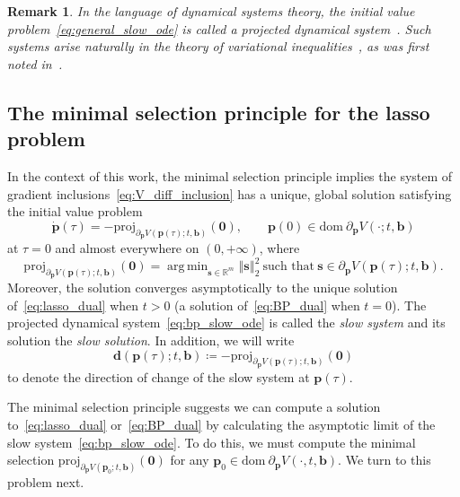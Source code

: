 \documentclass[11pt]{article}
\numberwithin{prop}{section}
\numberwithin{lem}{section}
\newtheorem{rem}{Remark}[section]
\numberwithin{rem}{section}
\numberwithin{cor}{section}
\numberwithin{thm}{section}
\numberwithin{defn}{section}
\numberwithin{fact}{section}
\theoremstyle{plain}
\def\bb {\boldsymbol{b}}
\def\bd {\boldsymbol{d}}
\def\bp {\boldsymbol{p}}
\def\bs {\boldsymbol{s}}
\def\R {\mathbb{R}}
\newcommand{\normsq}[1]{\left\Vert{#1} \right\Vert_{2}^{2}}
\def\dom {\mathrm{dom~}}    %
\def\proj {\mathrm{proj}}
\def\Rm {\R^m}
\DeclareMathOperator*{\argmin}{arg\,min}
\def\bpo {\bp_{0}}
\begin{document}
\begin{rem}
In the language of dynamical systems theory, the initial value problem~\eqref{eq:general_slow_ode} is called a \emph{projected dynamical system}~\cite{dupuis1993dynamical}. Such systems arise naturally in the theory of variational inequalities~\cite[Chapter 17]{attouch2014variational}, as was first noted in~\cite{dupuis1991lipschitz}.
\end{rem}




\subsection{The minimal selection principle for the lasso problem}\label{subsec:selection_principle}

In the context of this work, the minimal selection principle implies the system of gradient inclusions~\eqref{eq:V_diff_inclusion} has a unique, global solution satisfying the initial value problem
\begin{equation}\label{eq:bp_slow_ode}
    \dot{\bp}(\tau) =-\proj_{\partial_{\bp} V(\bp(\tau);t,\bb)}(\boldsymbol{0}), \qquad \bp(0) \in \dom \partial_{\bp} V(\cdot;t,\bb)
\end{equation}
at $\tau = 0$ and almost everywhere on $(0,+\infty)$, where
\[
\proj_{\partial_{\bp} V(\bp(\tau);t,\bb)}(\boldsymbol{0}) = \argmin_{\bs \in \Rm} \normsq{\bs} \ \text{such that} \ \bs \in \partial_{\bp}V(\bp(\tau);t,\bb).
\]
Moreover, the solution converges asymptotically to the unique solution of~\eqref{eq:lasso_dual} when $t>0$ (a solution of~\eqref{eq:BP_dual} when $t=0$). The projected dynamical system~\eqref{eq:bp_slow_ode} is called the \emph{slow system} and its solution the \emph{slow solution}. In addition, we will write
\begin{equation}\label{eq:steepest_dd}
\bd(\bp(\tau);t,\bb) \coloneqq -\proj_{\partial_{\bp} V(\bp(\tau);t,\bb)}(\boldsymbol{0})
\end{equation}
to denote the direction of change of the slow system at $\bp(\tau)$. 


The minimal selection principle suggests we can compute a solution to~\eqref{eq:lasso_dual} or~\eqref{eq:BP_dual} by calculating the asymptotic limit of the slow system~\eqref{eq:bp_slow_ode}. To do this, we must compute the minimal selection $\proj_{\partial_{\bp} V(\bpo;t,\bb)}(\boldsymbol{0})$ for any $\bpo \in \dom \partial_{\bp}V(\cdot,t,\bb)$. We turn to this problem next.

\end{document}

